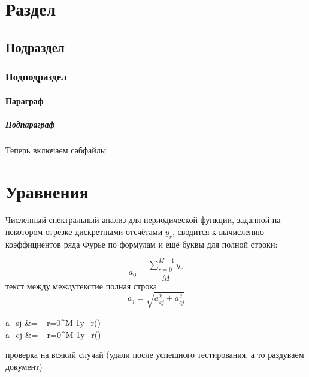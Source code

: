 \documentclass[a4paper]{article}
\begin{document}
	\tableofcontents
	\section{Раздел}
	\blindtext
	\subsection{Подраздел}
	\blindtext
	\subsubsection{Подподраздел}
	\blindtext
	\paragraph{Параграф}
	\blindtext
	\subparagraph{Подпараграф}
	\blindtext
	
	\newpage
	
	\vfill
	
	Теперь включаем сабфайлы
	
	\vfill
	
	\newpage
	
	
	
	\tableofcontents
	
	\section{Уравнения}
	Численный спектральный анализ для периодической функции, заданной на некотором отрезке дискретными отсчётами $y_r$, сводится к вычислению коэффициентов ряда Фурье по формулам и ещё буквы для полной строки:
	
	\begin{equation}\label{eq:a0}
		a_0=\frac{\sum\limits_{r=0}^{M-1}y_r}{M}
	\end{equation}
	текст между междутекстие полная строка
	\begin{equation}
		a_j=\sqrt{a_{sj}^2+a_{cj}^2}
	\end{equation}
\blindtext
	
	\begin{aleq}\label{eq:ascj}
		a_{sj} &= \sum\limits_{r=0}^{M-1}y_r\sin\left(\right)\\
		a_{cj} &= \sum\limits_{r=0}^{M-1}y_r\cos\left(\right)
	\end{aleq}
проверка на всякий случай (удали после успешного тестирования, а то раздуваем документ)
	\nocite{*}
\end{document}
